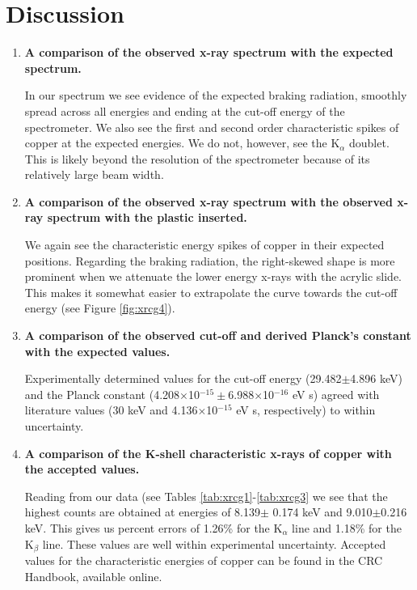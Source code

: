 \documentclass[justified]{tufte-book}
\begin{document}
\section{Discussion}
\begin{enumerate}[resume]

\item {\bf A comparison of the observed x-ray spectrum with the expected spectrum.}\newline

In our spectrum we see evidence of the expected braking radiation, smoothly spread across all energies and ending at the cut-off energy of the spectrometer. We also see the first and second order characteristic spikes of copper at the expected energies. We do not, however, see the K$_{\alpha}$ doublet. This is likely beyond the resolution of the spectrometer because of its relatively large beam width.

\item {\bf A comparison of the observed x-ray spectrum with the observed x-ray spectrum with the plastic inserted.}\newline

We again see the characteristic energy spikes of copper in their expected positions. Regarding the braking radiation, the right-skewed shape is more prominent when we attenuate the lower energy x-rays with the acrylic slide. This makes it somewhat easier to extrapolate the curve towards the cut-off energy (see Figure \ref{fig:xrcg4}).

\item {\bf A comparison of the observed cut-off and derived Planck's constant with the expected values.}\newline

Experimentally determined values for the cut-off energy (29.482$\pm$4.896 keV) and the Planck constant (4.208$\times$10$^{-15}\pm$6.988$\times$10$^{-16}$ eV s) agreed with literature values (30 keV and 4.136$\times$10$^{-15}$ eV s, respectively) to within uncertainty.

\item {\bf A comparison of the K-shell characteristic x-rays of copper with the accepted values.}\newline

Reading from our data (see Tables \ref{tab:xrcg1}-\ref{tab:xrcg3} we see that the highest counts are obtained at energies of 8.139$\pm$ 0.174 keV and 9.010$\pm$0.216 keV. This gives us percent errors of 1.26\% for the K$_{\alpha}$ line and 1.18\% for the K$_{\beta}$ line. These values are well within experimental uncertainty. Accepted values for the characteristic energies of copper can be found in the CRC Handbook, available online.


\end{enumerate}
\end{document}

